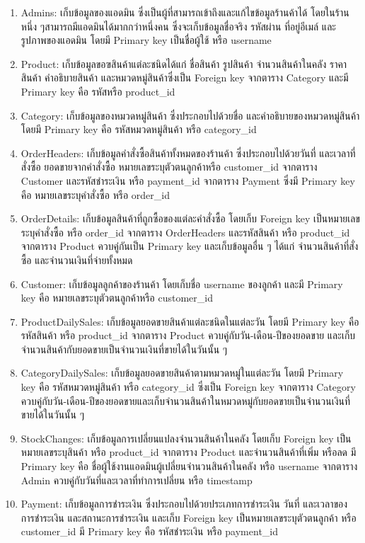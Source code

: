 \begin{enumerate}
  \item  Admins: เก็บข้อมูลของแอดมิน ซึ่งเป็นผู้ที่สามารถเข้าถึงและแก้ไขข้อมูลร้านค้าได้ โดยในร้านหนึ่ง ๆสามารถมีแอดมินได้มากกว่าหนึ่งคน ซึ่งจะเก็บข้อมูลชื่อจริง รหัสผ่าน ที่อยู่อีเมล์ และรูปภาพของแอดมิน โดยมี Primary key เป็นชื่อผู้ใช้ หรือ username
  \item Product: เก็บข้อมูลขอฃสินค้าแต่ละชนิดได้แก่ ชื่อสินค้า รูปสินค้า จำนวนสินค้าในคลัง ราคาสินค้า คำอธิบายสินค้า และหมวดหมู่สินค้าซึ่งเป็น Foreign key จากตาราง Category และมี Primary key คือ รหัสหรือ product\_id 
  \item Category: เก็บข้อมูลของหมวดหมู่สินค้า ซึ่งประกอบไปด้วยชื่อ และคำอธิบายของหมวดหมู่สินค้า โดยมี Primary key คือ รหัสหมวดหมู่สินค้า หรือ category\_id 
  \item OrderHeaders: เก็บข้อมูลคำสั่งซื้อสินค้าทั้งหมดของร้านค้า ซึ่งประกอบไปด้วยวันที่ และเวลาที่สั่งซื้อ ยอดขายจากคำสั่งซื้อ หมายเลขระบุตัวตนลูกค้าหรือ customer\_id จากตาราง Customer และรหัสชำระเงิน หรือ payment\_id  จากตาราง Payment ซึ่งมี Primary key คือ หมายเลขระบุคำสั่งซื้อ หรือ order\_id
  \item  OrderDetails: เก็บข้อมูลสินค้าที่ถูกซื้อของแต่ละคำสั่งซื้อ โดยเก็บ Foreign key เป็นหมายเลขระบุคำสั่งซื้อ หรือ order\_id จากตาราง OrderHeaders และรหัสสินค้า หรือ product\_id จากตาราง Product ควบคู่กันเป็น Primary key และเก็บข้อมูลอื่น ๆ ได้แก่ จำนวนสินค้าที่สั่งซื้อ และจำนวนเงินที่จ่ายทั้งหมด
  \item Customer: เก็บข้อมูลลูกค้าของร้านค้า โดยเก็บชื่อ username ของลูกค้า และมี Primary key คือ หมายเลขระบุตัวตนลูกค้าหรือ customer\_id 
  \item ProductDailySales: เก็บข้อมูลยอดขายสินค้าแต่ละชนิดในแต่ละวัน โดยมี Primary key คือ รหัสสินค้า หรือ product\_id จากตาราง Product ควบคู่กับวัน-เดือน-ปีของยอดขาย และเก็บจำนวนสินค้ากับยอดขายเป็นจำนวนเงินที่ขายได้ในวันนั้น ๆ
  \item CategoryDailySales: เก็บข้อมูลยอดขายสินค้าตามหมวดหมู่ในแต่ละวัน โดยมี Primary key คือ รหัสหมวดหมู่สินค้า หรือ category\_id ซึ่งเป็น Foreign key จากตาราง Category ควบคู่กับวัน-เดือน-ปีของยอดขายและเก็บจำนวนสินค้าในหมวดหมู่กับยอดขายเป็นจำนวนเงินที่ขายได้ในวันนั้น ๆ
  \item StockChanges: เก็บข้อมูลการเปลี่ยนแปลงจำนวนสินค้าในคลัง โดยเก็บ Foreign key เป็นหมายเลขระบุสินค้า หรือ product\_id จากตาราง Product และจำนวนสินค้าที่เพิ่ม หรือลด มี Primary key คือ ชื่อผู้ใช้งานแอดมินผู้เปลี่ยนจำนวนสินค้าในคลัง หรือ username จากตาราง Admin ควบคู่กับวันที่และเวลาที่ทำการเปลี่ยน หรือ timestamp
  \item Payment: เก็บข้อมูลการชำระเงิน ซึ่งประกอบไปด้วยประเภทการชำระเงิน วันที่ และเวลาของการชำระเงิน และสถานะการชำระเงิน และเก็บ Foreign key เป็นหมายเลขระบุตัวตนลูกค้า หรือ customer\_id  มี Primary key คือ รหัสชำระเงิน หรือ payment\_id 
 
\end{enumerate}



